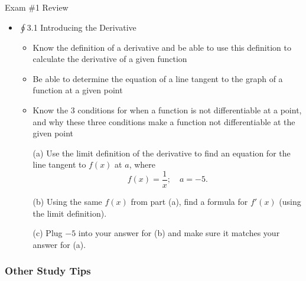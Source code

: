 \documentclass[cal1spr16Lectures.tex]{subfiles}
\begin{document}
\begin{frame}[allowframebreaks]{Exam \#1 Review}
\begin{itemize}
\begin{ex}
\begin{columns}[T]
\begin{column}{.55\textwidth}
\begin{itemize}
	\hspace{6pc}$0<|x-2|<\delta$
	\end{itemize}
	\end{column}
\end{columns}
\end{ex}
In this example, the two-sided limits at $x=1$ and $x=2$ do not exist.
\framebreak
\item $\oint$3.1 Introducing the Derivative
	\begin{itemize}\footnotesize
	\item Know the definition of a derivative and be able to use this definition to calculate the derivative of a given function
	\item Be able to determine the equation of a line tangent to the graph of a function at a given point
	\item Know the 3 conditions for when a function is not differentiable at a point, and why these three conditions make a function not differentiable at the given point
	\end{itemize}
\begin{ex}
	\begin{itemize}\footnotesize
	\item[(a)] Use the limit definition of the derivative to find an equation for the line tangent to $f(x)$ at $a$, where
	\[f(x)=\frac{1}{x};\quad a=-5.\]
	\item[(b)] Using the same $f(x)$ from part (a), find a formula for $f'(x)$ (using the limit definition).
	\item[(c)] Plug $-5$ into your answer for (b) and make sure it matches your answer for (a).
	\end{itemize}
\end{ex}
\end{itemize}
\end{frame}

\subsubsection{Other Study Tips}
\end{document}
